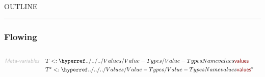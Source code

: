 


    OUTLINE
  \tableofcontents
\begin{center}
\rule{3in}{0.4pt}
\end{center}

\subsubsection{Flowing}\hypertarget{flowing}{}\label{flowing}

\begin{align*}
  [ \
  \KEY{Funcon} \quad & \NAMEREF{left-to-right} \\
  \KEY{Alias} \quad & \NAMEREF{l-to-r} \\
  \KEY{Funcon} \quad & \NAMEREF{right-to-left} \\
  \KEY{Alias} \quad & \NAMEREF{r-to-l} \\
  \KEY{Funcon} \quad & \NAMEREF{sequential} \\
  \KEY{Alias} \quad & \NAMEREF{seq} \\
  \KEY{Funcon} \quad & \NAMEREF{effect} \\
  \KEY{Funcon} \quad & \NAMEREF{choice} \\
  \KEY{Funcon} \quad & \NAMEREF{if-true-else} \\
  \KEY{Alias} \quad & \NAMEREF{if-else} \\
  \KEY{Funcon} \quad & \NAMEREF{while-true} \\
  \KEY{Alias} \quad & \NAMEREF{while} \\
  \KEY{Funcon} \quad & \NAMEREF{do-while-true} \\
  \KEY{Alias} \quad & \NAMEREF{do-while} \\
  \KEY{Funcon} \quad & \NAMEREF{interleave} \\
  \KEY{Datatype} \quad & \NAMEREF{yielding} \\
  \KEY{Funcon} \quad & \NAMEREF{signal} \\
  \KEY{Funcon} \quad & \NAMEREF{yielded} \\
  \KEY{Funcon} \quad & \NAMEREF{yield} \\
  \KEY{Funcon} \quad & \NAMEREF{yield-on-value} \\
  \KEY{Funcon} \quad & \NAMEREF{yield-on-abrupt} \\
  \KEY{Funcon} \quad & \NAMEREF{atomic}
  \ ]
\end{align*}
\begin{align*}
  \KEY{Meta-variables} \quad
  & \VAR{T} <: \NAMEHYPER{../../../Values}{Value-Types}{values} \qquad \\& \VAR{T}\STAR <: \NAMEHYPER{../../../Values}{Value-Types}{values}\STAR
\end{align*}
